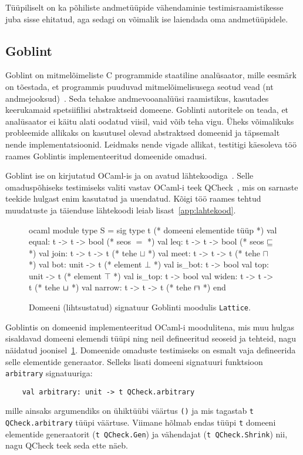 \documentclass[../thesis.tex]{subfiles}
\begin{document}
Tüüpiliselt on ka põhiliste andmetüüpide vähendaminie testimisraamistikesse juba sisse ehitatud, aga sedagi on võimalik ise laiendada oma andmetüüpidele.

\subsection{Goblint}
Goblint on mitmelõimeliste C programmide staatiline analüsaator, mille eesmärk on tõestada, et programmis puuduvad mitmelõimelisusega seotud vead (nt andmejooksud)~\cite{goblint2016}. Seda tehakse andmevooanalüüsi raamistikus, kasutades keerukamaid spetsiifilisi abstraktseid domeene. Goblinti autoritele on teada, et analüsaator ei käitu alati oodatud viisil, vaid võib teha vigu. Üheks võimalikuks probleemide allikaks on kasutusel olevad abstraktsed domeenid ja täpsemalt nende implementatsioonid. Leidmaks nende vigade allikat, testitigi käesoleva töö raames Goblintis implementeeritud domeenide omadusi.

Goblint ise on kirjutatud OCaml-is ja on avatud lähtekoodiga~\cite{goblint_repo}. Selle omaduspõhiseks testimiseks valiti vastav OCaml-i teek QCheck~\cite{qcheck_repo}, mis on sarnaste teekide hulgast enim kasutatud ja uuendatud. Kõigi töö raames tehtud muudatuste ja täienduse lähtekoodi leiab lisast~\ref{app:lahtekood}.

\begin{figure}
	\centering
	\begin{bminted}[mathescape]{ocaml}
		module type S =
		sig
		  type t (* domeeni elementide tüüp *)
		  val equal: t -> t -> bool (* seos $=$ *)
		  val leq: t -> t -> bool (* seos $\sqsubseteq$ *)
		  val join: t -> t -> t (* tehe $\sqcup$ *)
		  val meet: t -> t -> t (* tehe $\sqcap$ *)
		  val bot: unit -> t (* element $\bot$ *)
		  val is_bot: t -> bool
		  val top: unit -> t (* element $\top$ *)
		  val is_top: t -> bool
		  val widen: t -> t -> t (* tehe $\widen$ *)
		  val narrow: t -> t -> t (* tehe $\narrow$ *)
		end
	\end{bminted}
	\caption{Domeeni (lihtsustatud) signatuur Goblinti moodulis \texttt{Lattice}.}
	\label{fig:lattice-s}
\end{figure}

Goblintis on domeenid implementeeritud OCaml-i moodulitena, mis muu hulgas sisaldavad domeeni elemendi tüüpi ning neil defineeritud seoseid ja tehteid, nagu näidatud joonisel~\ref{fig:lattice-s}. Domeenide omaduste testimiseks on esmalt vaja defineerida selle elementide generaator. Selleks lisati domeeni signatuuri funktsioon \texttt{arbitrary} signatuuriga:
\begin{verbatim}
	val arbitrary: unit -> t QCheck.arbitrary
\end{verbatim}
mille ainsaks argumendiks on ühiktüübi väärtus \texttt{()} ja mis tagastab \texttt{t QCheck.arbitrary} tüüpi väärtuse. Viimane hõlmab endas tüüpi \texttt{t} domeeni elementide generaatorit (\texttt{t QCheck.Gen}) ja vähendajat (\texttt{t QCheck.Shrink}) nii, nagu QCheck teek seda ette näeb.
\end{document}
